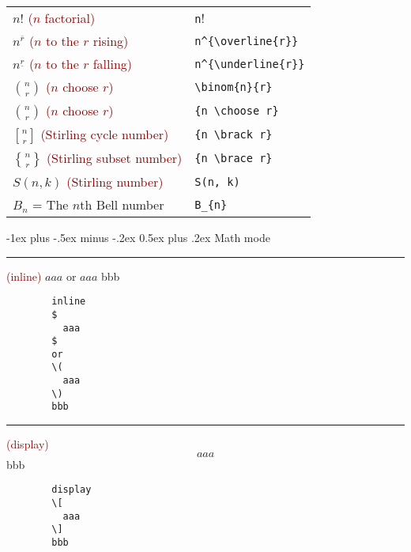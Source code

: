 \documentclass[a4paper,10pt,landscape]{article}
\makeatletter
\renewcommand{\section}{\@startsection{section}{1}{0mm}%
	                                {-1ex plus -.5ex minus -.2ex}%
	                                {0.5ex plus .2ex}%
	                                {\normalfont\large\bfseries}}
\newcommand{\hSep}{{\color{colorSep}\hrule}}
\theoremstyle{definition}
\theoremstyle{remark}
\newcommand{\hDesc}[1]{\textcolor{darkred}{(#1)}} %
\makeatother
\begin{document}
\begin{multicols}{3}
\begin{tabular}{@{}ll@{}}
	$n!$	\hDesc{$n$ factorial}	&\verb!n!!\\[2pt]
	$n^{\overline{r}}$	\hDesc{$n$ to the $r$ rising}	&\verb!n^{\overline{r}}!\\[2pt]
	$n^{\underline{r}}$	\hDesc{$n$ to the $r$ falling}	&\verb!n^{\underline{r}}!\\[2pt]
	$\binom{n}{r}$	\hDesc{$n$ choose $r$}	&\verb!\binom{n}{r}!\\[2pt]
	${n \choose r}$	\hDesc{$n$ choose $r$}	&\verb!{n \choose r}!\\[2pt]
	${n \brack r}$	\hDesc{Stirling cycle number}	&\verb!{n \brack r}!\\[2pt]
	${n \brace r}$	\hDesc{Stirling subset number}	&\verb!{n \brace r}!\\[2pt]
	$S(n, k)$	\hDesc{Stirling number}	&\verb!S(n, k)!\\
	$B_{n}$ = The $n$th Bell number	&\verb!B_{n}!\\
\end{tabular}




\section{Math mode}

\hSep
\begin{multicols}{2}
		\hDesc{inline} 
		$
		  aaa
		$  
		or 
		\(
		  aaa
		\) 
		bbb
\columnbreak
	\begin{verbatim}
		inline
		$
		  aaa
		$  
		or 
		\(
		  aaa
		\) 
		bbb
	\end{verbatim}
\end{multicols}
\hSep
\begin{multicols}{2}
		\hDesc{display} \[ aaa\] bbb
\columnbreak
	\begin{verbatim}
		display
		\[
		  aaa
		\] 
		bbb
	\end{verbatim}
\end{multicols}




\end{multicols}
\end{document}

